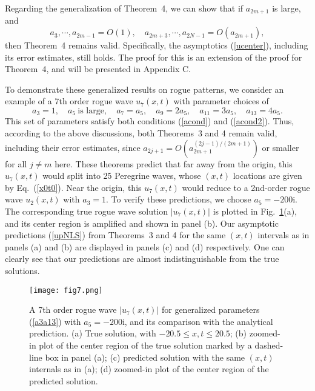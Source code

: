 \documentclass[amsmath,amssymb]{revtex4}
\def\[{\begin{equation}}
\def\]{\end{equation}}
\begin{document}
Regarding the generalization of Theorem~4, we can show that if $a_{2m+1}$ is large, and
\[ \label{acond2}
a_3, \cdots, a_{2m-1} =O(1), \quad a_{2m+3}, \cdots, a_{2N-1}=O(a_{2m+1}),
\]
then Theorem~4 remains valid. Specifically, the asymptotics (\ref{ucenter}), including its error estimates, still holds. The proof for this is an extension of the proof for Theorem~4, and will be presented in Appendix C.

To demonstrate these generalized results on rogue patterns, we consider an example of a 7th order rogue wave $u_7(x,t)$ with parameter choices of
\[ \label{a3a13}
a_3=1, \quad a_5\ \mbox{is large}, \quad a_7=a_5, \quad a_9=2a_5, \quad a_{11}=3a_5, \quad a_{13}=4a_5.
\]
This set of parameters satisfy both conditions (\ref{acond}) and (\ref{acond2}). Thus, according to the above discussions, both Theorems~3 and 4 remain valid, including their error estimates, since $a_{2j+1}=O\left( a_{2m+1}^{(2j-1)/(2m+1)} \right)$ or smaller for all $j\ne m$ here. These theorems predict that far away from the origin, this $u_7(x,t)$ would split into 25 Peregrine waves, whose $(x,t)$ locations are given by Eq.~(\ref{x0t0}). Near the origin, this $u_7(x,t)$ would reduce to a 2nd-order rogue wave $u_2(x,t)$ with $a_3=1$. To verify these predictions, we choose $a_5=-200\textrm{i}$. The corresponding true rogue wave solution $|u_7(x,t)|$ is plotted in Fig.~\ref{f:multiple}(a), and its center region is amplified and shown in panel (b). Our asymptotic predictions (\ref{upNLS}) from Theorems~3 and 4 for the same $(x,t)$ intervals as in panels (a) and (b) are displayed in panels (c) and (d) respectively. One can clearly see that our predictions are almost indistinguishable from the true solutions.

\begin{figure}[htb]
\begin{center}
\texttt{[image: fig7.png]}
\caption{A 7th order rogue wave $|u_7(x,t)|$ for generalized parameters (\ref{a3a13}) with $a_5=-200\textrm{i}$, and its comparison with the analytical prediction. (a) True solution, with $ -20.5\le x, t\le 20.5$; (b)
zoomed-in plot of the center region of the true solution marked by a dashed-line box in panel (a); (c) predicted solution with the same $(x, t)$ internals as in (a); (d) zoomed-in plot of the center region of the predicted solution.  }   \label{f:multiple}
\end{center}
\end{figure}

\vspace{-0.5cm}
\end{document}
